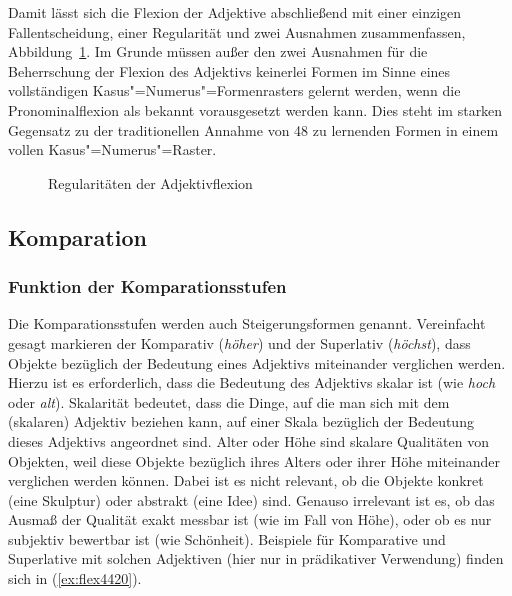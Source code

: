 Damit lässt sich die Flexion der Adjektive abschließend mit einer einzigen Fallentscheidung, einer Regularität und zwei Ausnahmen zusammenfassen, Abbildung~\ref{fig:adjregeln}.
Im Grunde müssen außer den zwei Ausnahmen für die Beherrschung der Flexion des Adjektivs keinerlei Formen im Sinne eines vollständigen Kasus"=Numerus"=Formenrasters gelernt werden, wenn die Pronominalflexion als bekannt vorausgesetzt werden kann.
Dies steht im starken Gegensatz zu der traditionellen Annahme von 48 zu lernenden Formen in einem vollen Kasus"=Numerus"=Raster.

\begin{figure}[!h]
  \centering
  \caption{Regularitäten der Adjektivflexion}
  \label{fig:adjregeln}
\end{figure}

\subsection{Komparation}

\label{sec:komparation}

\subsubsection{Funktion der Komparationsstufen}


Die Komparationsstufen werden auch Steigerungsformen genannt.
Vereinfacht gesagt markieren der Komparativ (\zB \textit{höher}) und der Superlativ (\textit{höchst}), dass Objekte bezüglich der Bedeutung eines Adjektivs miteinander verglichen werden.
Hierzu ist es erforderlich, dass die Bedeutung des Adjektivs skalar ist (wie \zB \textit{hoch} oder \textit{alt}).
Skalarität bedeutet, dass die Dinge, auf die man sich mit dem (skalaren) Adjektiv beziehen kann, auf einer Skala bezüglich der Bedeutung dieses Adjektivs angeordnet sind.
Alter oder Höhe sind \zB skalare Qualitäten von Objekten, weil diese Objekte bezüglich ihres Alters oder ihrer Höhe miteinander verglichen werden können.
Dabei ist es nicht relevant, ob die Objekte konkret (\zB eine Skulptur) oder abstrakt (\zB eine Idee) sind.
Genauso irrelevant ist es, ob das Ausmaß der Qualität exakt messbar ist (wie im Fall von Höhe), oder ob es nur subjektiv bewertbar ist (wie Schönheit).
Beispiele für Komparative und Superlative mit solchen Adjektiven (hier nur in prädikativer Verwendung) finden sich in (\ref{ex:flex4420}).

